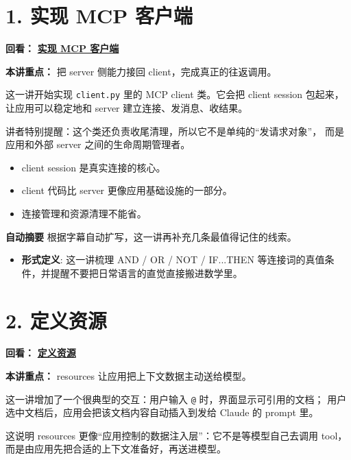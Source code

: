 \documentclass[UTF8,a4paper,11pt]{ctexart}
\newcommand{\videolink}[2]{%
  \href{#1}{\textcolor{videoblue}{\textbf{#2}}}%
}
\begin{document}
\section*{1. 实现 MCP 客户端}
\noindent\textbf{回看：}\videolink{https://www.coursera.org/learn/introduction-to-model-context-protocol/home/module/3}{实现 MCP 客户端}

\textbf{本讲重点：} 把 server 侧能力接回 client，完成真正的往返调用。

这一讲开始实现 \texttt{client.py} 里的 MCP client 类。它会把 client session 包起来，
让应用可以稳定地和 server 建立连接、发消息、收结果。

讲者特别提醒：这个类还负责收尾清理，所以它不是单纯的“发请求对象”，
而是应用和外部 server 之间的生命周期管理者。

\begin{itemize}
  \item client session 是真实连接的核心。
  \item client 代码比 server 更像应用基础设施的一部分。
  \item 连接管理和资源清理不能省。
\end{itemize}

\begin{keyconcept}
\textbf{自动摘要}
根据字幕自动扩写，这一讲再补充几条最值得记住的线索。
\begin{itemize}
  \item \textbf{形式定义}: 这一讲梳理 AND / OR / NOT / IF...THEN 等连接词的真值条件，并提醒不要把日常语言的直觉直接搬进数学里。
\end{itemize}
\end{keyconcept}

\section*{2. 定义资源}
\noindent\textbf{回看：}\videolink{https://www.coursera.org/learn/introduction-to-model-context-protocol/home/module/3}{定义资源}

\textbf{本讲重点：} resources 让应用把上下文数据主动送给模型。

这一讲增加了一个很典型的交互：用户输入 \texttt{@} 时，界面显示可引用的文档；
用户选中文档后，应用会把该文档内容自动插入到发给 Claude 的 prompt 里。

这说明 resources 更像“应用控制的数据注入层”：它不是等模型自己去调用 tool，
而是由应用先把合适的上下文准备好，再送进模型。
\end{document}
